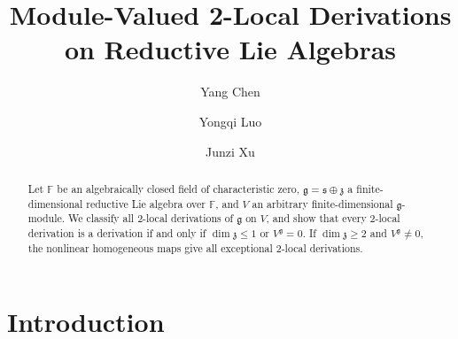 \documentclass[12pt,reqno]{amsart}
\theoremstyle{definition}
\theoremstyle{remark}
\numberwithin{equation}{section}
\newcommand{\F}{\mathbb{F}}
\newcommand{\g}{\mathfrak{g}}
\newcommand{\s}{\mathfrak{s}}
\newcommand{\z}{\mathfrak{z}}
\begin{document}
\setcounter{page}{1}

\title[2-Local Derivations on Reductive Lie Algebras]
{Module-Valued 2-Local Derivations on Reductive Lie Algebras}

\author{Yang Chen}

\address{Y. Chen: School of Science, Jimei University, Xiamen, Fujian, 361021, P. R. China}


\author{Yongqi Luo}

\address{Y. Luo: School of Science, Jimei University, Xiamen, Fujian, 361021, P. R. China}


\author{Junzi Xu}

\address{J. Xu: School of Science, Jimei University, Xiamen, Fujian, 361021, P. R. China}


\date{}



\begin{abstract} Let \(\F\) be an algebraically closed field of characteristic zero,
\(\g=\s\oplus\z\) a finite-dimensional reductive Lie algebra over \(\F\),
and \(V\) an arbitrary finite-dimensional \(\g\)-module.  We classify all 2-local derivations of \(\g\) on \(V\),
and show that every 2-local derivation is a derivation if and only if
\(\dim\z\leq1\) or \(V^\g=0\).  If \(\dim\z\geq2\) and \(V^\g\ne0\), the
nonlinear homogeneous maps give all exceptional 2-local derivations.
\end{abstract}

\maketitle


\section{Introduction}
\end{document}
